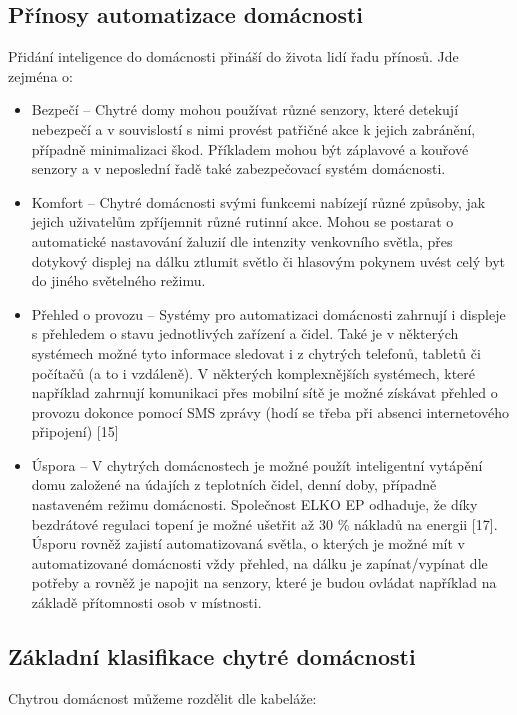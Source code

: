 \newpage
\subsection*{Přínosy automatizace domácnosti}
Přidání inteligence do domácnosti přináší do života lidí řadu přínosů. Jde zejména o:

\begin{itemize}
\item Bezpečí – Chytré domy mohou používat různé senzory, které detekují nebezpečí a v souvislostí s nimi provést patřičné akce k jejich zabránění, případně minimalizaci škod. Příkladem mohou být záplavové a kouřové senzory a v neposlední řadě také zabezpečovací systém domácnosti.
\item Komfort – Chytré domácnosti svými funkcemi nabízejí různé způsoby, jak jejich uživatelům zpříjemnit různé rutinní akce. Mohou se postarat o automatické nastavování žaluzií dle intenzity venkovního světla, přes dotykový displej na dálku ztlumit světlo či hlasovým pokynem uvést celý byt do jiného světelného režimu. 
\item Přehled o provozu – Systémy pro automatizaci domácnosti zahrnují i displeje s přehledem o stavu jednotlivých zařízení a čidel. Také je v některých systémech možné tyto informace sledovat i z chytrých telefonů, tabletů či počítačů (a to i vzdáleně). V některých komplexnějších systémech, které například zahrnují komunikaci přes mobilní sítě je možné získávat přehled o provozu dokonce pomocí SMS zprávy (hodí se třeba při absenci internetového připojení) [15]
\item Úspora – V chytrých domácnostech je možné použít inteligentní vytápění domu založené na údajích z teplotních čidel, denní doby, případně nastaveném režimu domácnosti. Společnost ELKO EP odhaduje, že díky bezdrátové regulaci topení je možné ušetřit až 30 \% nákladů na energii [17]. Úsporu rovněž zajistí automatizovaná světla, o kterých je možné mít v automatizované domácnosti vždy přehled, na dálku je zapínat/vypínat dle potřeby a rovněž je napojit na senzory, které je budou ovládat například na základě přítomnosti osob v místnosti.
\end{itemize}
    

\subsection*{Základní klasifikace chytré domácnosti}
Chytrou domácnost můžeme rozdělit dle kabeláže:


